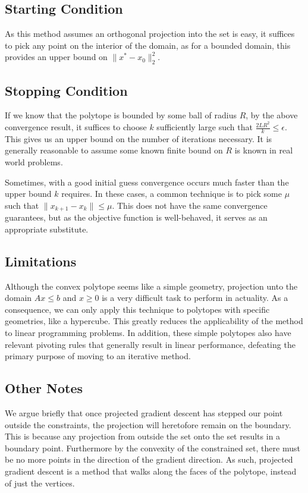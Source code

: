\documentclass[letterpaper,twocolumn,12pt]{article}
\begin{document}
\subsection{Starting Condition}
As this method assumes an orthogonal projection into the set is easy, it suffices to
pick any point on the interior of the domain, as for a bounded domain, this provides
an upper bound on $\|x^*-x_0\|_2^2$.

\subsection{Stopping Condition}
If we know that the polytope is bounded by some ball of radius $R$, by the above convergence
result, it suffices to choose $k$ sufficiently large such that $\frac{2LR^2}{k}\leq\epsilon$.
This gives us an upper bound on the number of iterations necessary. It is generally reasonable to assume
some known finite bound on $R$ is known in real world problems.

Sometimes, with a good initial guess convergence occurs much faster than the upper
bound $k$ requires. In these cases, a common technique is to pick some $\mu$ such that
$\|x_{k+1}-x_k\|\leq\mu$. This does not have the same convergence guarantees, but as
the objective function is well-behaved, it serves as an appropriate substitute.

\subsection{Limitations}
Although the convex polytope seems like a simple geometry, projection unto the domain
$Ax\leq b$ and $x\geq 0$ is a very difficult task to
perform in actuality. As a consequence, we can only apply this technique to polytopes
with specific geometries, like a hypercube. This greatly reduces the applicability of
the method to linear programming problems. In addition, these simple polytopes also
have relevant pivoting rules that generally result in linear performance, defeating the
primary purpose of moving to an iterative method.

\subsection{Other Notes}
We argue briefly that once projected gradient descent has stepped our point outside the
constraints, the projection will heretofore remain on the boundary. This is because
any projection from outside the set onto the set results in a boundary point. Furthermore
by the convexity of the constrained set, there must be no more points in the direction
of the gradient direction. As such, projected gradient descent is a method that walks
along the faces of the polytope, instead of just the vertices.
\end{document}
